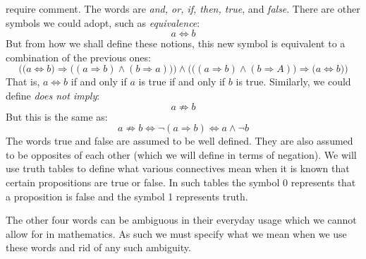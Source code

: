     require comment. The words are \textit{and, or, if, then, true}, and
    \textit{false}. There are other symbols we could adopt, such as
    \textit{equivalence}:
    \begin{equation*}
        a\Leftrightarrow{b}
    \end{equation*}
    But from how we shall define these notions, this new symbol is equivalent to
    a combination of the previous ones:
    \begin{equation*}
        \Big(\big(a\Leftrightarrow{b}\big)\Rightarrow
             \big((a\Rightarrow{b})\land(b\Rightarrow{a})\big)\Big)
        \land\Big(\big((a\Rightarrow{b})\land(b\Rightarrow{A})\big)
            \Rightarrow\big(a\Leftrightarrow{b}\big)\Big)
    \end{equation*}
    That is, $a\Leftrightarrow{b}$ if and only if $a$ is true if and only if $b$
    is true. Similarly, we could define \textit{does not imply}:
    \begin{equation*}
        a\not\Rightarrow{b}
    \end{equation*}
    But this is the same as:
    \begin{equation*}
        a\not\Rightarrow{b}\Longleftrightarrow
        \neg(a\Rightarrow{b})
        \Longleftrightarrow
        a\land\neg{b}
    \end{equation*}
    The words true and false are assumed to be well defined. They are also
    assumed to be opposites of each other (which we will define in terms of
    negation). We will use truth tables to define what
    various connectives mean when it is known that certain propositions are true
    or false. In such tables the symbol 0 represents that a proposition is false
    and the symbol 1 represents truth.
    \par\hfill\par
    The other four words can be ambiguous in their everyday usage which we
    cannot allow for in mathematics. As such we must specify what we mean when
    we use these words and rid of any such ambiguity.
